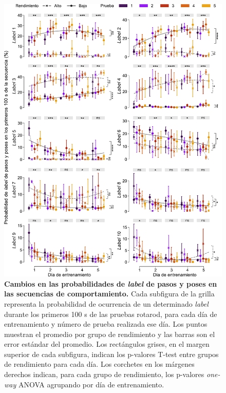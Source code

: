 \begin{figure}[htbp]
    \centering
    \includegraphics[width=0.99\linewidth]{figuras/capitulo4/probabilidades_labels_stp.pdf}
    \caption{\textbf{Cambios en las probabilidades de \textit{label} de pasos y poses en las secuencias de comportamiento.} Cada subfigura de la grilla representa la probabilidad de ocurrencia de un determinado \textit{label} durante los primeros 100 s de las pruebas rotarod, para cada día de entrenamiento y número de prueba realizada ese día. Los puntos muestran el promedio por grupo de rendimiento y las barras son el error estándar del promedio. Los rectángulos grises, en el margen superior de cada subfigura, indican los p-valores T-test entre grupos de rendimiento para cada día. Los corchetes en los márgenes derechos indican, para cada grupo de rendimiento, los p-valores \textit{one-way} ANOVA agrupando por día de entrenamiento.}
    \label{fig:capitulo4_probabilidades_labels_stp}
\end{figure}